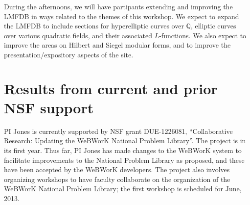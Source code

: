 \documentclass[12pt]{amsart}
\numberwithin{equation}{section}
\newcommand{\Q}{\mathbb Q}
\begin{document}
During the afternoons, we will have partipants extending and improving
the \textsf{LMFDB} in ways related to the themes of this workshop.  We expect
to expand the \textsf{LMFDB} to include sections for hyperelliptic curves over
$\Q$, elliptic curves over various quadratic fields, and their
associated $L$-functions.  We also expect to improve the areas on
Hilbert and Siegel modular forms, and to improve the
presentation/expository aspects of the site.


\section{Results from current and prior NSF support}
PI Jones is currently supported by NSF grant DUE-1226081,
``Collaborative Research: Updating the WeBWorK National Problem
Library''.  The project is in its first year.  Thus far, PI Jones has
made changes to the WeBWorK system to facilitate improvements to the
National Problem Library as proposed, and these have been accepted by
the WeBWorK developers.  The project also involves organizing
workshops to have faculty collaborate on the organization of the
WeBWorK National Problem Library; the first workshop is scheduled for
June, 2013.
\end{document}
